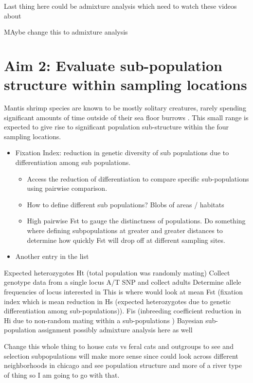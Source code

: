 \documentclass[11pt]{article}
\begin{document}
Last thing here could be admixture analysis which need to watch these videos about


MAybe change this to admixture analysis 

\section*{Aim 2: Evaluate sub-population structure within sampling locations}
Mantis shrimp species are known to be mostly solitary creatures, rarely spending significant amounts of time outside of their sea floor burrows \cite{Mead2010}. This small range is expected to give rise to significant population sub-structure within the four sampling locations. 


\begin{itemize}
	\item Fixation Index: reduction in genetic diversity of sub populations due to differentiation among sub populations.
	\begin{itemize}
		\item Access the reduction of differentiation to compare specific sub-populations using pairwise comparison. 
		\item How to define different sub populations? Blobs of areas / habitats
		\item High pairwise Fst to gauge the distinctness of populations. Do something where defining subpopulations 
		at greater and greater distances to determine how quickly Fst will drop off at different sampling sites. 
	\end{itemize}
	\item Another entry in the list
\end{itemize}



Expected heterozygotes Ht (total population was randomly mating)
Collect genotype data from a single locus A/T SNP and collect
adults 
Determine allele frequencies of locus interested in
This is where would look at mean Fst (fixation index which is mean reduction in Hs (expected heterozygotes due to genetic differentiation among sub-populations)).
Fis (inbreeding coefficient reduction in Hi due to non-random mating within a sub-populations )
Bayesian sub-population assignment 
possibly admixture analysis here as well

Change this whole thing to house cats vs feral cats and outgroups to see and selection subpopulations will make more sense since could look across different neighborhoods in chicago and see population
structure and more of a river type of thing so I am going to go with that.
\end{document}
